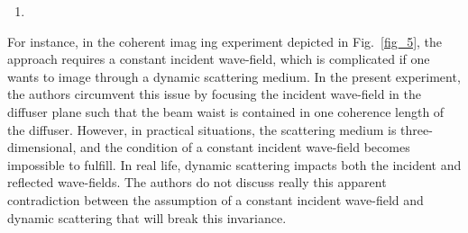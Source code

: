 \documentclass[12pt]{article}
\newenvironment{solved_reviewercomment}
    {\begin{tcolorbox}[width=\linewidth,colback=gray!5,colframe=solved_commentcolor!50,title=Reviewer Comment,left=5pt,right=5pt]}
    {\end{tcolorbox}}
\begin{document}
\begin{enumerate}[label=\arabic*.]
\item \leavevmode
\end{enumerate}
\vspace{-1em}
\begin{solved_reviewercomment}
    For instance, in the coherent imag ing experiment depicted in Fig.~\ref{fig_5}, the approach requires a constant incident wave-field, which is complicated if one wants to image through a dynamic scattering medium. In the present experiment, the authors circumvent this issue by focusing the incident wave-field in the diffuser plane such that the beam waist is contained in one coherence length of the diffuser. However, in practical situations, the scattering medium is three-dimensional, and the condition of a constant incident wave-field becomes impossible to fulfill. In real life, dynamic scattering impacts both the incident and reflected wave-fields. The authors do not discuss really this apparent contradiction between the assumption of a constant incident wave-field and dynamic scattering that will break this invariance.
\end{solved_reviewercomment}
\end{document}
